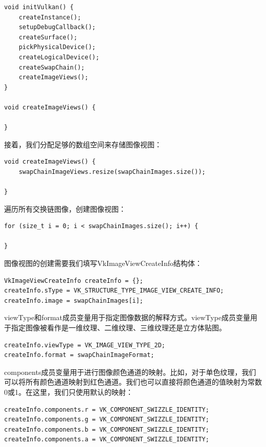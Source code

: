 \documentclass{ctexart}
\begin{document}
\begin{lstlisting}[language={[ANSI]C}]
void initVulkan() {
	createInstance();
	setupDebugCallback();
	createSurface();
	pickPhysicalDevice();
	createLogicalDevice();
	createSwapChain();
	createImageViews();
}

void createImageViews() {

}
\end{lstlisting}

接着，我们分配足够的数组空间来存储图像视图：

\begin{lstlisting}[language={[ANSI]C}]
void createImageViews() {
	swapChainImageViews.resize(swapChainImages.size());

}
\end{lstlisting}

遍历所有交换链图像，创建图像视图：

\begin{lstlisting}[language={[ANSI]C}]
for (size_t i = 0; i < swapChainImages.size(); i++) {

}
\end{lstlisting}

图像视图的创建需要我们填写VkImageViewCreateInfo结构体：

\begin{lstlisting}[language={[ANSI]C}]
VkImageViewCreateInfo createInfo = {};
createInfo.sType = VK_STRUCTURE_TYPE_IMAGE_VIEW_CREATE_INFO;
createInfo.image = swapChainImages[i];
\end{lstlisting}

viewType和format成员变量用于指定图像数据的解释方式。viewType成员变量用于指定图像被看作是一维纹理、二维纹理、三维纹理还是立方体贴图。

\begin{lstlisting}[language={[ANSI]C}]
createInfo.viewType = VK_IMAGE_VIEW_TYPE_2D;
createInfo.format = swapChainImageFormat;
\end{lstlisting}

components成员变量用于进行图像颜色通道的映射。比如，对于单色纹理，我们可以将所有颜色通道映射到红色通道。我们也可以直接将颜色通道的值映射为常数0或1。在这里，我们只使用默认的映射：

\begin{lstlisting}[language={[ANSI]C}]
createInfo.components.r = VK_COMPONENT_SWIZZLE_IDENTITY;
createInfo.components.g = VK_COMPONENT_SWIZZLE_IDENTITY;
createInfo.components.b = VK_COMPONENT_SWIZZLE_IDENTITY;
createInfo.components.a = VK_COMPONENT_SWIZZLE_IDENTITY;
\end{lstlisting}
\end{document}
